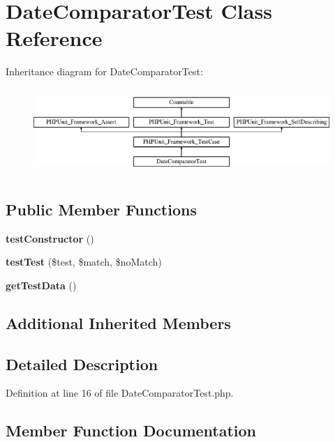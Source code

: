 \section{Date\+Comparator\+Test Class Reference}
\label{class_symfony_1_1_component_1_1_finder_1_1_tests_1_1_comparator_1_1_date_comparator_test}
Inheritance diagram for Date\+Comparator\+Test\+:\begin{figure}[H]
\begin{center}
\leavevmode
\includegraphics[height=3.303835cm]{class_symfony_1_1_component_1_1_finder_1_1_tests_1_1_comparator_1_1_date_comparator_test}
\end{center}
\end{figure}
\subsection*{Public Member Functions}
\begin{DoxyCompactItemize}
\item 
{\bf test\+Constructor} ()
\item 
{\bf test\+Test} (\$test, \$match, \$no\+Match)
\item 
{\bf get\+Test\+Data} ()
\end{DoxyCompactItemize}
\subsection*{Additional Inherited Members}


\subsection{Detailed Description}


Definition at line 16 of file Date\+Comparator\+Test.\+php.



\subsection{Member Function Documentation}
